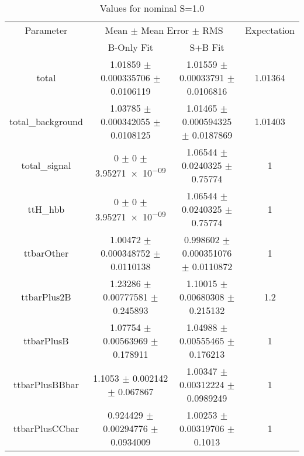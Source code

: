 \begin{table}
\centering
\caption{Values for nominal S=1.0}
\begin{tabular}{cccc}
\toprule
Parameter & \multicolumn{2}{c}{Mean $\pm$ Mean Error $\pm$ RMS} & Expectation\\
 & B-Only Fit & S+B Fit & \\
\midrule
total & \num{1.01859} $\pm$ \num{0.000335706} $\pm$ \num{0.0106119} & \num{1.01559} $\pm$ \num{0.00033791} $\pm$ \num{0.0106816} & \num{1.01364}\\
total\_background & \num{1.03785} $\pm$ \num{0.000342055} $\pm$ \num{0.0108125} & \num{1.01465} $\pm$ \num{0.000594325} $\pm$ \num{0.0187869} & \num{1.01403}\\
total\_signal & \num{0} $\pm$ \num{0} $\pm$ \num{3.95271e-09} & \num{1.06544} $\pm$ \num{0.0240325} $\pm$ \num{0.75774} & \num{1}\\
ttH\_hbb & \num{0} $\pm$ \num{0} $\pm$ \num{3.95271e-09} & \num{1.06544} $\pm$ \num{0.0240325} $\pm$ \num{0.75774} & \num{1}\\
ttbarOther & \num{1.00472} $\pm$ \num{0.000348752} $\pm$ \num{0.0110138} & \num{0.998602} $\pm$ \num{0.000351076} $\pm$ \num{0.0110872} & \num{1}\\
ttbarPlus2B & \num{1.23286} $\pm$ \num{0.00777581} $\pm$ \num{0.245893} & \num{1.10015} $\pm$ \num{0.00680308} $\pm$ \num{0.215132} & \num{1.2}\\
ttbarPlusB & \num{1.07754} $\pm$ \num{0.00563969} $\pm$ \num{0.178911} & \num{1.04988} $\pm$ \num{0.00555465} $\pm$ \num{0.176213} & \num{1}\\
ttbarPlusBBbar & \num{1.1053} $\pm$ \num{0.002142} $\pm$ \num{0.067867} & \num{1.00347} $\pm$ \num{0.00312224} $\pm$ \num{0.0989249} & \num{1}\\
ttbarPlusCCbar & \num{0.924429} $\pm$ \num{0.00294776} $\pm$ \num{0.0934009} & \num{1.00253} $\pm$ \num{0.00319706} $\pm$ \num{0.1013} & \num{1}\\
\bottomrule
\end{tabular}
\end{table}